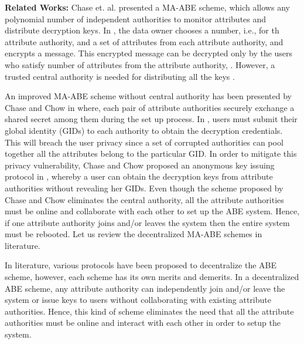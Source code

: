 \documentclass[10pt,journal]{IEEEtran}
\begin{document}
\textbf{Related Works:} Chase et. al. \cite{maabe} presented a MA-ABE scheme, which allows any polynomial number of independent authorities to monitor attributes and distribute decryption keys. In \cite{maabe}, the data owner chooses a number, i.e.,  for {th} attribute authority, and a set of attributes from each attribute authority, and encrypts a message. This encrypted message can be decrypted  only by the users who satisfy   number of attributes from the  attribute authority, . However,  a trusted central authority  is needed for distributing all the keys  \cite{maabe}.



An improved MA-ABE scheme without central authority has been presented by Chase and Chow in \cite{imaabe} where, each pair of attribute authorities securely exchange a shared secret among them during the set up process. In \cite{maabe}, users must submit their global identity (GIDs) to each authority to obtain the decryption credentials. This will breach the user privacy since a set of corrupted authorities can pool together all the attributes belong to the particular GID. In order to mitigate this privacy vulnerability, Chase and Chow proposed an anonymous key issuing protocol in \cite{imaabe}, whereby a user can obtain the decryption keys from attribute authorities without revealing her GIDs. Even though the scheme proposed by Chase and Chow eliminates the central authority, all the attribute authorities must be online and collaborate with each other to set up the ABE system. Hence, if one attribute authority joins and/or leaves the system then the entire system must be rebooted. Let us review the decentralized MA-ABE schemes in literature.



In literature, various protocols  have been proposed to decentralize  the ABE scheme, however, each scheme has its own merits and demerits. In a decentralized ABE scheme, any attribute authority  can independently join and/or leave the system or  issue keys to users without collaborating with existing attribute authorities. Hence, this kind of scheme eliminates the need that all the attribute authorities must be online and interact with each other in order to setup the system.
\end{document}

